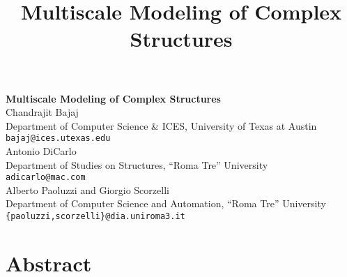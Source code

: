 \title{Multiscale Modeling of Complex Structures}
\author{} \institute{}

\begin{center}

\textbf{\Large Multiscale Modeling of Complex Structures}\\
\vspace{10mm}
{\large Chandrajit Bajaj}\\
Department of Computer Science \& ICES, University of Texas at Austin\\
{\tt bajaj@ices.utexas.edu}\\
\vspace{4mm}
{\large Antonio DiCarlo}\\
Department of Studies on Structures, ``Roma Tre'' University\\
{\tt adicarlo@mac.com}\\
\vspace{4mm}
{\large Alberto Paoluzzi and  Giorgio Scorzelli}\\
Department of Computer Science and Automation, ``Roma Tre'' University\\
{\tt \{paoluzzi,scorzelli\}@dia.uniroma3.it}

\end{center}

\section*{Abstract}

